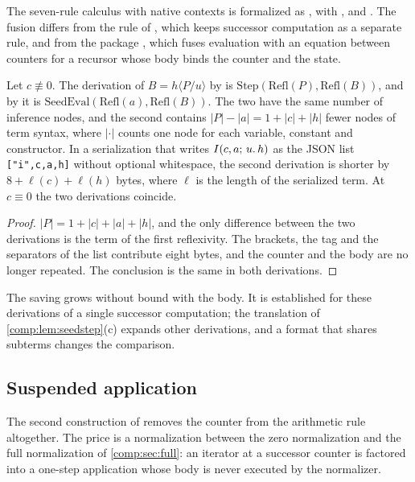 The seven-rule calculus with native contexts is formalized as
, with ,  and
. The fusion differs from the rule of
, which keeps successor computation as a separate
rule, and from the package , which fuses evaluation
with an equation between counters for a recursor whose body binds the
counter and the state.

\begin{proposition}
\label{comp:prop:seedcert}
Let $c\not\equiv0$. The derivation of
$B=h\langle P/u\rangle$ by  is
$\mathrm{Step}(\mathrm{Refl}(P),\mathrm{Refl}(B))$, and by
 it is
$\mathrm{SeedEval}(\mathrm{Refl}(a),\mathrm{Refl}(B))$. The two have the
same number of inference nodes, and the second contains
$|P|-|a|=1+|c|+|h|$ fewer nodes of term syntax, where $|\cdot|$ counts one
node for each variable, constant and constructor. In a serialization that
writes $I(c,a;\,u.\,h)$ as the JSON list \texttt{["i",c,a,h]} without
optional whitespace, the second derivation is shorter by
$8+\ell(c)+\ell(h)$ bytes, where $\ell$ is the length of the serialized
term. At $c\equiv0$ the two derivations coincide.
\end{proposition}

\begin{proof}
$|P|=1+|c|+|a|+|h|$, and the only difference between the two derivations is
the term of the first reflexivity. The brackets, the tag and the separators
of the list contribute eight bytes, and the counter and the body are no
longer repeated. The conclusion is the same in both derivations.
\end{proof}

The saving grows without bound with the body. It is established for these
derivations of a single successor computation; the translation of
\cref{comp:lem:seedstep}(c) expands other derivations, and a format that
shares subterms changes the comparison.

\subsection{Suspended application}
\label{comp:sec:app}

The second construction of  removes the counter from
the arithmetic rule altogether. The price is a normalization between the
zero normalization and the full normalization of \cref{comp:sec:full}: an
iterator at a successor counter is factored into a one-step application
whose body is never executed by the normalizer.

